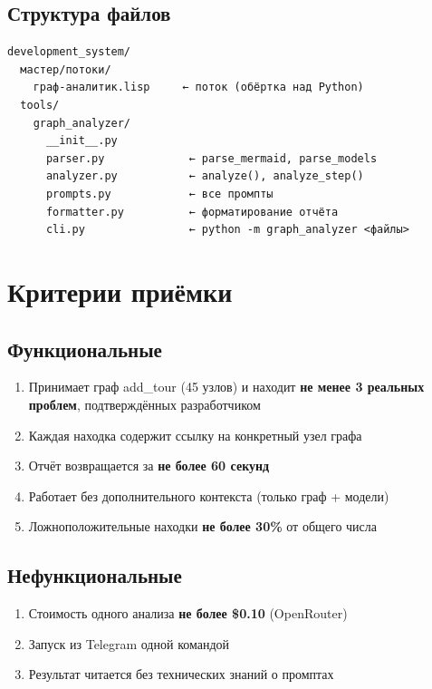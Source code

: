 \documentclass[11pt, a4paper, oneside]{article}
\begin{document}
\subsection{Структура файлов}

\begin{lstlisting}[language={}, numbers=none]
development_system/
  мастер/потоки/
    граф-аналитик.lisp     ← поток (обёртка над Python)
  tools/
    graph_analyzer/
      __init__.py
      parser.py             ← parse_mermaid, parse_models
      analyzer.py           ← analyze(), analyze_step()
      prompts.py            ← все промпты
      formatter.py          ← форматирование отчёта
      cli.py                ← python -m graph_analyzer <файлы>
\end{lstlisting}

\section{Критерии приёмки}

\subsection{Функциональные}

\begin{enumerate}
  \item Принимает граф add\_tour (45 узлов) и находит
    \textbf{не менее 3 реальных проблем}, подтверждённых разработчиком
  \item Каждая находка содержит ссылку на конкретный узел графа
  \item Отчёт возвращается за \textbf{не более 60 секунд}
  \item Работает без дополнительного контекста (только граф + модели)
  \item Ложноположительные находки \textbf{не более 30\%} от общего числа
\end{enumerate}

\subsection{Нефункциональные}

\begin{enumerate}
  \item Стоимость одного анализа \textbf{не более \$0.10} (OpenRouter)
  \item Запуск из Telegram одной командой
  \item Результат читается без технических знаний о промптах
\end{enumerate}
\end{document}
